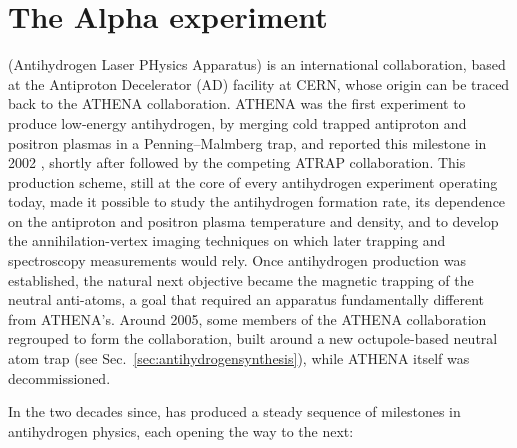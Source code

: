 \chapter{The Alpha experiment}
\label{ch:apparatus}

\ALPHA (Antihydrogen Laser PHysics Apparatus) is an international collaboration, based at the Antiproton Decelerator (AD) facility at CERN, whose origin can be traced back to the ATHENA collaboration. ATHENA was the first experiment to produce low-energy antihydrogen, by merging cold trapped antiproton and positron plasmas in a Penning--Malmberg trap, and reported this milestone in 2002 \cite{Amoretti2002}, shortly after followed by the competing ATRAP collaboration. This production scheme, still at the core of every antihydrogen experiment operating today, made it possible to study the antihydrogen formation rate, its dependence on the antiproton and positron plasma temperature and density, and to develop the annihilation-vertex imaging techniques on which later trapping and spectroscopy measurements would rely. Once antihydrogen production was established, the natural next objective became the magnetic trapping of the neutral anti-atoms, a goal that required an apparatus fundamentally different from ATHENA's. Around 2005, some members of the ATHENA collaboration regrouped to form the \ALPHA collaboration, built around a new octupole-based neutral atom trap (see Sec.~\ref{sec:antihydrogensynthesis}), while ATHENA itself was decommissioned.

In the two decades since, \ALPHA has produced a steady sequence of milestones in antihydrogen physics, each opening the way to the next:

